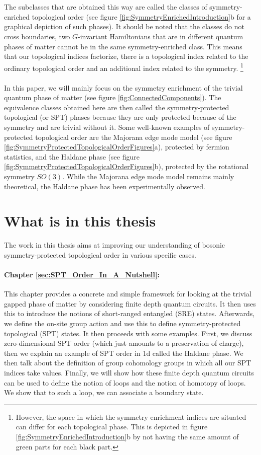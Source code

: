 \\\\
The subclasses that are obtained this way are called the classes of symmetry-enriched topological order (see figure \ref{fig:SymmetryEnrichedIntroduction}b for a graphical depiction of such phases). It should be noted that the classes do not cross boundaries, two $G$-invariant Hamiltonians that are in different quantum phases of matter cannot be in the same symmetry-enriched class. This means that our topological indices factorize, there is a topological index related to the ordinary topological order and an additional index related to the symmetry. \footnote{However, the space in which the symmetry enrichment indices are situated can differ for each topological phase. This is depicted in figure \ref{fig:SymmetryEnrichedIntroduction}b by not having the same amount of green parts for each black part.}
\\\\
In this paper, we will mainly focus on the symmetry enrichment of the trivial quantum phase of matter (see figure \ref{fig:ConnectedComponents}). The equivalence classes obtained here are then called the symmetry-protected topological (or SPT) phases because they are only protected because of the symmetry and are trivial without it. Some well-known examples of symmetry-protected topological order are the Majorana edge mode model (see figure \ref{fig:SymmetryProtectedTopologicalOrderFigures}a), protected by fermion statistics, and the Haldane phase (see figure \ref{fig:SymmetryProtectedTopologicalOrderFigures}b), protected by the rotational symmetry $SO(3)$. While the Majorana edge mode model remains mainly theoretical, the Haldane phase has been experimentally\cite{sompet2022realizing} observed.

\section{What is in this thesis}
The work in this thesis aims at improving our understanding of bosonic symmetry-protected topological order in various specific cases.
\paragraph{Chapter \ref{sec:SPT_Order_In_A_Nutshell}:}This chapter provides a concrete and simple framework for looking at the trivial gapped phase of matter by considering finite depth quantum circuits. It then uses this to introduce the notions of short-ranged entangled (SRE) states. Afterwards, we define the on-site group action and use this to define symmetry-protected topological (SPT) states. It then proceeds with some examples. First, we discuss zero-dimensional SPT order (which just amounts to a preservation of charge), then we explain an example of SPT order in 1d called the Haldane phase. We then talk about the definition of group cohomology groups in which all our SPT indices take values. Finally, we will show how these finite depth quantum circuits can be used to define the notion of loops and the notion of homotopy of loops. We show that to such a loop, we can associate a boundary state.
